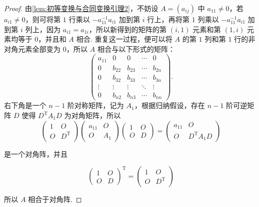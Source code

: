 \begin{proof}
    由\autoref{lem:初等变换与合同变换引理2}，不妨设 $A = (a_{ij})$ 中 $a_{11} \neq 0$，若 $a_{i1} \neq 0$，则可将第 $1$ 行乘以 $-a_{11}^{-1}a_{i1}$ 加到第 $i$ 行上，再将第 $1$ 列乘以 $-a_{11}^{-1}a_{i1}$ 加到第 $i$ 列上，因为 $a_{i1} = a_{1i}$，所以新得到的矩阵的第 $(i, 1)$ 元素和第 $(1, i)$ 元素均等于 $0$，并且和 $A$ 相合. 重复这一过程，便可以将 $A$ 的第 $1$ 列和第 $1$ 行的非对角元素全部变为 $0$，所以 $A$ 相合与以下形式的矩阵：
    \[
        \begin{pmatrix}
            a_{11} & 0 & 0 & \cdots & 0 \\
            0 & b_{22} & b_{23} & \cdots & b_{2n} \\
            0 & b_{32} & b_{33} & \cdots & b_{3n} \\
            \vdots & \vdots & \vdots & \ddots & \vdots \\
            0 & b_{n2} & b_{n3} & \cdots & b_{nn}
        \end{pmatrix}.
    \]
    右下角是一个 $n - 1$ 阶对称矩阵，记为 $A_1$，根据归纳假设，存在 $n - 1$ 阶可逆矩阵 $D$ 使得 $D^\mathrm{T}A_1D$ 为对角矩阵，所以
    \[
        \begin{pmatrix}
            1 & O \\
            O & D^\mathrm{T}
        \end{pmatrix}
        \begin{pmatrix}
            a_{11} & O \\
            O & A_1
        \end{pmatrix}
        \begin{pmatrix}
            1 & O \\
            O & D
        \end{pmatrix} = \begin{pmatrix}
            a_{11} & O \\
            O & D^\mathrm{T}A_1D
        \end{pmatrix}
    \]

    是一个对角阵，并且

    \[
        \begin{pmatrix}
            1 & O \\
            O & D
        \end{pmatrix}^\mathrm{T} = \begin{pmatrix}
            1 & O \\
            O & D^\mathrm{T}
        \end{pmatrix}
    \]

    所以 $A$ 相合于对角阵.
\end{proof}

